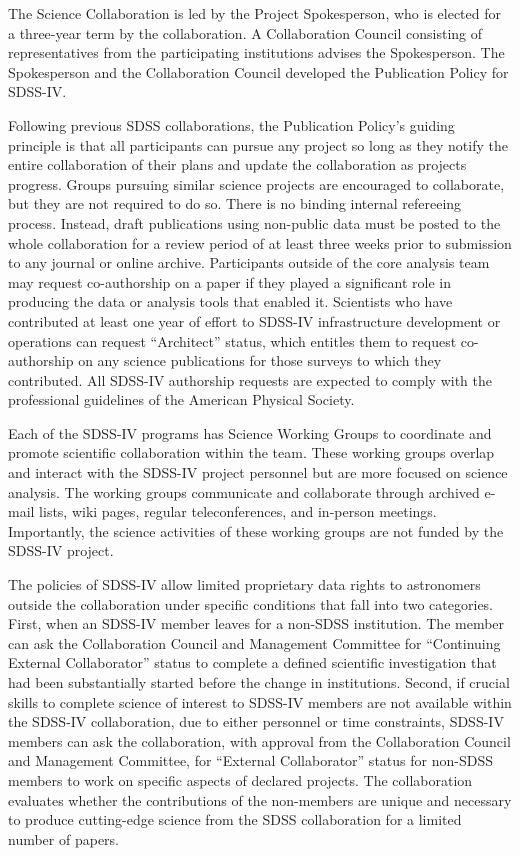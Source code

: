 The Science Collaboration is led by the Project Spokesperson, who is
elected for a three-year term by the collaboration. A Collaboration
Council consisting of representatives from the participating
institutions advises the Spokesperson. The Spokesperson and the
Collaboration Council developed the Publication Policy for SDSS-IV.

Following previous SDSS collaborations, the Publication Policy's
guiding principle is that all participants can pursue any project so
long as they notify the entire collaboration of their plans and update
the collaboration as projects progress.  Groups pursuing similar
science projects are encouraged to collaborate, but they are not
required to do so. There is no binding internal refereeing process.
Instead, draft publications using non-public data must be posted to
the whole collaboration for a review period of at least three weeks
prior to submission to any journal or online archive.  Participants
outside of the core analysis team may request co-authorship on a paper
if they played a significant role in producing the data or analysis
tools that enabled it. Scientists who have contributed at least one
year of effort to SDSS-IV infrastructure development or operations can
request ``Architect'' status, which entitles them to request
co-authorship on any science publications for those surveys to which
they contributed.  All SDSS-IV authorship requests are expected to
comply with the professional guidelines of the American Physical
Society.

Each of the SDSS-IV programs has Science Working Groups to coordinate
and promote scientific collaboration within the team.  These working
groups overlap and interact with the SDSS-IV project personnel but are
more focused on science analysis.  The working groups communicate and
collaborate through archived e-mail lists, wiki pages, regular
teleconferences, and in-person meetings.  Importantly, the science
activities of these working groups are not funded by the SDSS-IV
project.

The policies of SDSS-IV allow limited proprietary data rights to
astronomers outside the collaboration under specific conditions that
fall into two categories. First, when an SDSS-IV member leaves for a
non-SDSS institution. The member can ask the Collaboration Council and
Management Committee for ``Continuing External Collaborator'' status
to complete a defined scientific investigation that had been
substantially started before the change in institutions. Second, if
crucial skills to complete science of interest to SDSS-IV members are
not available within the SDSS-IV collaboration, due to either
personnel or time constraints, SDSS-IV members can ask the
collaboration, with approval from the Collaboration Council and
Management Committee, for ``External Collaborator'' status for
non-SDSS members to work on specific aspects of declared projects. The
collaboration evaluates whether the contributions of the non-members
are unique and necessary to produce cutting-edge science from the SDSS
collaboration for a limited number of papers.

